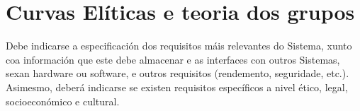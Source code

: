 \chapter{Curvas Elíticas e teoria dos grupos}

Debe indicarse a especificación dos requisitos máis relevantes do Sistema, xunto coa información que este debe almacenar e as interfaces con outros Sistemas, sexan hardware ou software, e outros requisitos (rendemento, seguridade, etc.). Asimesmo, deberá indicarse se existen requisitos específicos a nivel ético, legal, socioeconómico e cultural. 